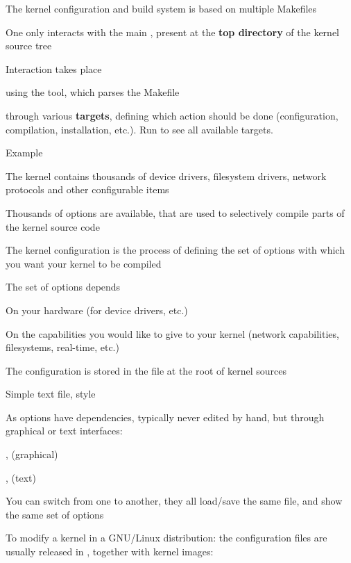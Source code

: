 
  \startitemize
  \item The kernel configuration and build system is based on multiple
    Makefiles
  \item One only interacts with the main , present at
    the {\bf top directory} of the kernel source tree
  \item Interaction takes place
    \startitemize
    \item using the  tool, which parses the Makefile
    \item through various {\bf targets}, defining which action should
      be done (configuration, compilation, installation, etc.). Run
       to see all available targets.
    \stopitemize
  \item Example
    \startitemize
    \item {}
    \item {}
    \stopitemize
  \stopitemize

  \startitemize
  \item The kernel contains thousands of device drivers, filesystem
    drivers, network protocols and other configurable items
  \item Thousands of options are available, that are used to
    selectively compile parts of the kernel source code
  \item The kernel configuration is the process of defining the set of
    options with which you want your kernel to be compiled
  \item The set of options depends
    \startitemize
    \item On your hardware (for device drivers, etc.)
    \item On the capabilities you would like to give to your kernel
      (network capabilities, filesystems, real-time, etc.)
    \stopitemize
  \stopitemize

  \startitemize
  \item The configuration is stored in the  file at the
    root of kernel sources
    \startitemize
    \item Simple text file,  style
    \stopitemize
  \item As options have dependencies, typically never edited by hand,
    but through graphical or text interfaces:
    \startitemize
    \item {},  (graphical)
    \item {},  (text)
    \item You can switch from one to another, they all load/save the
      same  file, and show the same set of options
    \stopitemize
  \item To modify a kernel in a GNU/Linux distribution: the
    configuration files are usually released in ,
    together with kernel images: 
  \stopitemize

